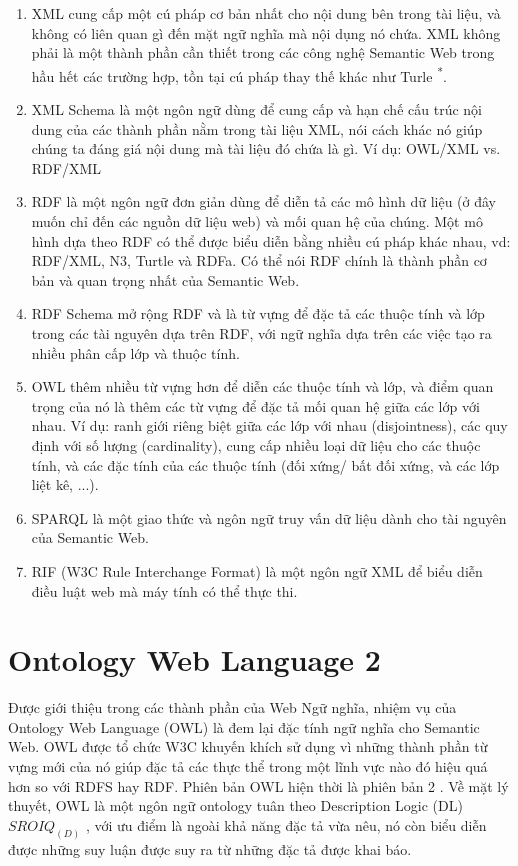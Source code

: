 \begin{enumerate}
	\item XML cung cấp một cú pháp cơ bản nhất cho nội dung bên trong tài liệu, và không có liên quan gì đến mặt ngữ nghĩa mà nội dụng nó chứa. XML không phải là một thành phần cần thiết trong các công nghệ Semantic Web trong hầu hết các trường hợp, tồn tại cú pháp thay thế khác như Turle \textsuperscript{*}. 
	\item XML Schema là một ngôn ngữ dùng để cung cấp và hạn chế cấu trúc nội dung của các thành phần nằm trong tài liệu XML, nói cách khác nó giúp chúng ta đáng giá nội dung mà tài liệu đó chứa là gì. Ví dụ: OWL/XML vs. RDF/XML
	\item RDF \cite{rdf} là một ngôn ngữ đơn giản dùng để diễn tả các mô hình dữ liệu (ở đây muốn chỉ đến các nguồn dữ liệu web) và mối quan hệ của chúng. Một mô hình dựa theo RDF có thể được biểu diễn bằng nhiều cú pháp khác nhau, vd: RDF/XML, N3, Turtle và RDFa. Có thể nói RDF chính là thành phần cơ bản và quan trọng nhất của Semantic Web.
	\item RDF Schema \cite{rdfs} mở rộng RDF và là từ vựng để đặc tả các thuộc tính và lớp trong các tài nguyên dựa trên RDF, với ngữ nghĩa dựa trên các việc tạo ra nhiều phân cấp lớp và thuộc tính.
	\item OWL thêm nhiều từ vựng hơn để diễn các thuộc tính và lớp, và điểm quan trọng của nó là thêm các từ vựng để đặc tả mối quan hệ giữa các lớp với nhau. Ví dụ: ranh giới riêng biệt giữa các lớp với nhau (disjointness), các quy định với số lượng (cardinality), cung cấp nhiều loại dữ liệu cho các thuộc tính, và các đặc tính của các thuộc tính (đối xứng/ bất đối xứng, và các lớp liệt kê, ...).
	\item SPARQL là một giao thức và ngôn ngữ truy vấn dữ liệu dành cho tài nguyên của Semantic Web.
	\item RIF (W3C Rule Interchange Format) là một ngôn ngữ XML để biểu diễn điều luật web mà máy tính có thể thực thi.
\end{enumerate}
{\let\thefootnote\relax{}
}
\section{Ontology Web Language 2}
Được giới thiệu trong các thành phần của Web Ngữ nghĩa, nhiệm vụ của Ontology Web Language (OWL) là đem lại đặc tính ngữ nghĩa cho Semantic Web. OWL được tổ chức W3C khuyến khích sử dụng vì những thành phần từ vựng mới của nó giúp đặc tả các thực thể trong một lĩnh vực nào đó hiệu quá hơn so với RDFS hay RDF. Phiên bản OWL hiện thời là phiên bản 2 \cite{owl2}. Về mặt lý thuyết, OWL là một ngôn ngữ ontology tuân theo Description Logic (DL) $SROIQ_{(D)}$ \cite{DL}, với ưu điểm là ngoài  khả năng đặc tả vừa nêu, nó còn biểu diễn được những suy luận được suy ra từ những đặc tả được khai báo.
